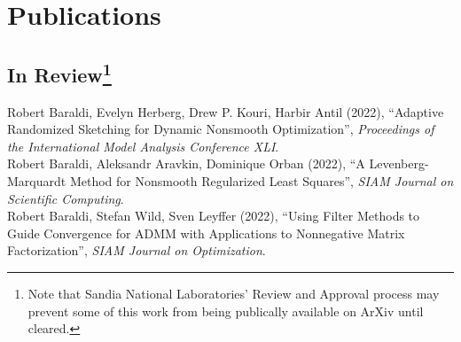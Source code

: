 \documentclass[10pt, a4paper]{article}
\newcommand{\years}[1]{\marginnote{\scriptsize #1}}
\begin{document}
\section*{Publications}
\subsection*{In Review\footnote{\tiny Note that Sandia National Laboratories' Review and Approval process may prevent some of this work from being publically available on ArXiv until cleared. }}
\years{2022} Robert Baraldi, Evelyn Herberg, Drew P. Kouri, Harbir Antil (2022), ``Adaptive Randomized Sketching for Dynamic Nonsmooth Optimization'', \emph{Proceedings of the International Model Analysis Conference XLI}.\\
\years{2022} Robert Baraldi, Aleksandr Aravkin, Dominique Orban (2022), ``A Levenberg-Marquardt Method for Nonsmooth Regularized Least Squares'',  \emph{SIAM Journal on Scientific Computing}.\\
\years{2022} Robert Baraldi, Stefan Wild, Sven Leyffer (2022), ``Using Filter Methods to Guide Convergence for ADMM with Applications to Nonnegative Matrix Factorization'', \emph{SIAM Journal on Optimization}.\\
\end{document}
